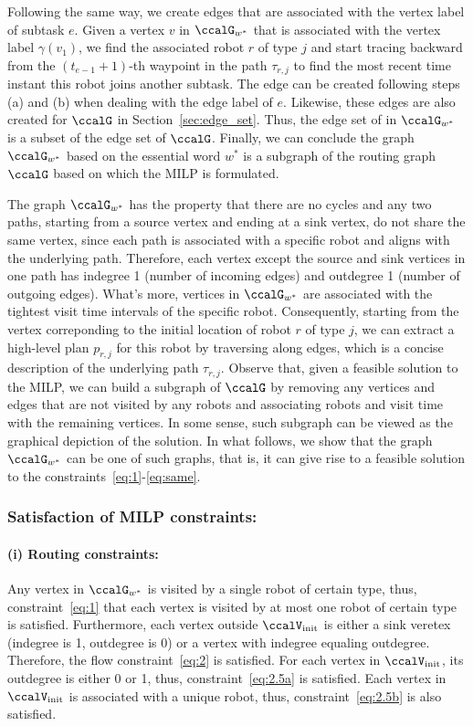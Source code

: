 \documentclass[Afour,sageh,times]{sagej}
\begin{document}
{{{Following the same way, we create edges that are associated with the vertex label of subtask $e$. Given a  vertex $v$ in $\ccalG_{w^*}$ that is associated with the vertex label $\gamma(v_1)$, we find  the associated robot $r$ of type $j$ and start tracing backward from the $(t_{e-1}+1)$-th waypoint in the path $\tau_{r,j}$ to find the most recent time instant this robot joins another subtask. The edge can be created following  steps (a) and (b) when dealing with the edge label of $e$. Likewise, these edges are also created for $\ccalG$ in Section~\ref{sec:edge_set}. Thus, the edge set of in $\ccalG_{w^*}$ is a subset of the edge set of $\ccalG$. Finally, we can conclude the graph $\ccalG_{w^*}$ based on the essential word $w^*$ is a subgraph of the routing graph $\ccalG$ based on which the MILP is formulated.


The graph $\ccalG_{w^*}$ has the property that there are no cycles and any two paths, starting from a source vertex and ending at a sink vertex, do not share the same vertex, since each path is associated with a specific robot and aligns with the underlying path. Therefore, each vertex except the source and sink vertices in one path has indegree 1 (number of incoming edges) and outdegree 1 (number of outgoing edges). What's more, vertices in $\ccalG_{w^*}$ are associated with the tightest visit time intervals of the specific robot. Consequently, starting from the vertex correponding to the initial location of robot $r$ of type $j$, we can extract a high-level plan $p_{r,j}$ for this robot by traversing along edges, which is a concise description of the underlying path $\tau_{r,j}$. Observe that, given a feasible solution to the MILP, we can build a subgraph of $\ccalG$ by removing any vertices and edges that are not visited by any robots and associating robots and visit time with the remaining vertices. In some sense, such subgraph can be viewed as the graphical depiction of the solution. In what follows, we show that the graph $\ccalG_{w^*}$ can be one of such graphs, that is, it can give rise to a feasible solution to the constraints~\eqref{eq:1}-\eqref{eq:same}.

\subsubsection{Satisfaction of MILP constraints:}
\paragraph{(i) Routing constraints:} Any vertex in $\ccalG_{w^*}$ is visited by a single robot of certain type, thus, constraint~\eqref{eq:1} that each vertex is visited by at most one robot of certain type is satisfied. Furthermore, each vertex outside $\ccalV_{\text{init}}$  is either a sink veretex (indegree is 1, outdegree is 0) or a vertex with indegree equaling outdegree. Therefore, the flow constraint~\eqref{eq:2} is satisfied. For each vertex in $\ccalV_\text{init}$, its outdegree is either 0 or 1, thus, constraint~\eqref{eq:2.5a} is satisfied. Each vertex in $\ccalV_\text{init}$ is associated with a unique robot, thus, constraint~\eqref{eq:2.5b} is also satisfied.
}}}
\end{document}
